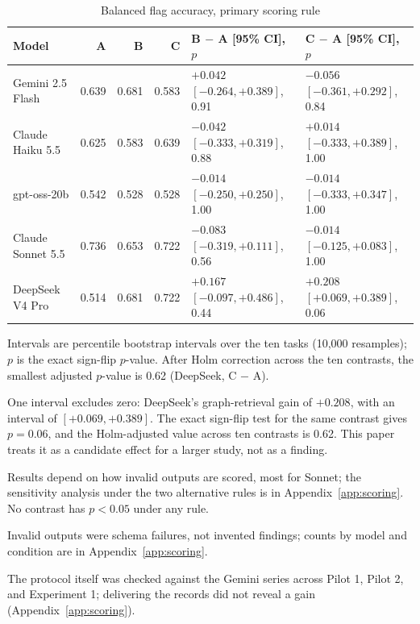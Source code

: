 \documentclass[11pt]{article}
\begin{document}
\begin{table}[ht]
\centering
\caption{Balanced flag accuracy, primary scoring rule}
\label{tab:primary}
\small
\begin{tabular}{lrrrll}
\toprule
Model & A & B & C & B $-$ A [95\% CI], $p$ & C $-$ A [95\% CI], $p$ \\
\midrule
Gemini 2.5 Flash & 0.639 & 0.681 & 0.583 & $+0.042$ $[-0.264, +0.389]$, 0.91 & $-0.056$ $[-0.361, +0.292]$, 0.84 \\
Claude Haiku 5.5 & 0.625 & 0.583 & 0.639 & $-0.042$ $[-0.333, +0.319]$, 0.88 & $+0.014$ $[-0.333, +0.389]$, 1.00 \\
gpt-oss-20b & 0.542 & 0.528 & 0.528 & $-0.014$ $[-0.250, +0.250]$, 1.00 & $-0.014$ $[-0.333, +0.347]$, 1.00 \\
Claude Sonnet 5.5 & 0.736 & 0.653 & 0.722 & $-0.083$ $[-0.319, +0.111]$, 0.56 & $-0.014$ $[-0.125, +0.083]$, 1.00 \\
DeepSeek V4 Pro & 0.514 & 0.681 & 0.722 & $+0.167$ $[-0.097, +0.486]$, 0.44 & $+0.208$ $[+0.069, +0.389]$, 0.06 \\
\bottomrule
\end{tabular}

\vspace{0.4em}
\begin{minipage}{0.92\linewidth}\footnotesize
Intervals are percentile bootstrap intervals over the ten tasks (10,000 resamples); $p$ is the exact sign-flip $p$-value. After Holm correction across the ten contrasts, the smallest adjusted $p$-value is 0.62 (DeepSeek, C $-$ A).
\end{minipage}
\end{table}

One interval excludes zero: DeepSeek's graph-retrieval gain of $+0.208$, with an interval of $[+0.069, +0.389]$. The exact sign-flip test for the same contrast gives $p = 0.06$, and the Holm-adjusted value across ten contrasts is 0.62. This paper treats it as a candidate effect for a larger study, not as a finding.

Results depend on how invalid outputs are scored, most for Sonnet; the sensitivity analysis under the two alternative rules is in Appendix~\ref{app:scoring}. No contrast has $p < 0.05$ under any rule.

Invalid outputs were schema failures, not invented findings; counts by model and condition are in Appendix~\ref{app:scoring}.

The protocol itself was checked against the Gemini series across Pilot 1, Pilot 2, and Experiment 1; delivering the records did not reveal a gain (Appendix~\ref{app:scoring}).
\end{document}
